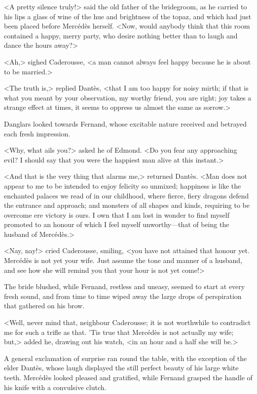  <A pretty silence truly!> said the old father of the bridegroom, as he carried to his lips a glass of wine of the hue and brightness of the topaz, and which had just been placed before Mercédès herself. <Now, would anybody think that this room contained a happy, merry party, who desire nothing better than to laugh and dance the hours away?> 

 <Ah,> sighed Caderousse, <a man cannot always feel happy because he is about to be married.> 

 <The truth is,> replied Dantès, <that I am too happy for noisy mirth; if that is what you meant by your observation, my worthy friend, you are right; joy takes a strange effect at times, it seems to oppress us almost the same as sorrow.> 

 Danglars looked towards Fernand, whose excitable nature received and betrayed each fresh impression. 

 <Why, what ails you?> asked he of Edmond. <Do you fear any approaching evil? I should say that you were the happiest man alive at this instant.> 

 <And that is the very thing that alarms me,> returned Dantès. <Man does not appear to me to be intended to enjoy felicity so unmixed; happiness is like the enchanted palaces we read of in our childhood, where fierce, fiery dragons defend the entrance and approach; and monsters of all shapes and kinds, requiring to be overcome ere victory is ours. I own that I am lost in wonder to find myself promoted to an honour of which I feel myself unworthy—that of being the husband of Mercédès.> 

 <Nay, nay!> cried Caderousse, smiling, <you have not attained that honour yet. Mercédès is not yet your wife. Just assume the tone and manner of a husband, and see how she will remind you that your hour is not yet come!> 

 The bride blushed, while Fernand, restless and uneasy, seemed to start at every fresh sound, and from time to time wiped away the large drops of perspiration that gathered on his brow. 

 <Well, never mind that, neighbour Caderousse; it is not worthwhile to contradict me for such a trifle as that. 'Tis true that Mercédès is not actually my wife; but,> added he, drawing out his watch, <in an hour and a half she will be.> 

 A general exclamation of surprise ran round the table, with the exception of the elder Dantès, whose laugh displayed the still perfect beauty of his large white teeth. Mercédès looked pleased and gratified, while Fernand grasped the handle of his knife with a convulsive clutch. 

